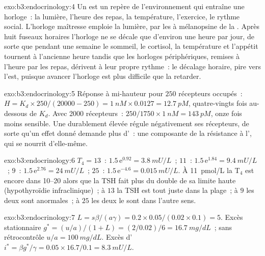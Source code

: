 \begin{solution}{exo:b3:endocrinology:4}
Un  est un repère de l'environnement qui entraîne une horloge~:
la lumière, l'heure des repas, la température, l'exercice, le rythme
social. L'horloge maîtresse emploie la lumière, par les  à mélanopsine de la . Après huit fuseaux horaires
l'horloge ne se décale que d'environ une heure par jour, de sorte que
pendant une semaine le sommeil, le cortisol, la température et l'appétit
tournent à l'ancienne heure tandis que les horloges périphériques,
remises à l'heure par les repas, dérivent à leur propre rythme~: le
décalage horaire, pire vers l'est, puisque avancer l'horloge est plus
difficile que la retarder.
\end{solution}

\begin{solution}{exo:b3:endocrinology:5}
Réponse à mi-hauteur pour $250$ récepteurs occupés~: $H = K_{d}\times
250/(\num{20000} - 250) = \qty{1}{nM}\times 0.0127 = \qty{12.7}{pM}$,
quatre-vingts fois au-dessous de $K_{d}$. Avec \num{2000} récepteurs~: $250/1750
\times \qty{1}{nM} = \qty{143}{pM}$, onze fois moins sensible. Une
 durablement élevée régule négativement ses récepteurs, de sorte
qu'un effet donné demande plus d'~: une composante de la
résistance à l', qui se nourrit d'elle-même.
\end{solution}

\begin{solution}{exo:b3:endocrinology:6}
$T_{4} = 13$~: $1.5\,\mathrm{e}^{0.92} = \qty{3.8}{mU/L}$~; $11$~:
$1.5\,\mathrm{e}^{1.84} = \qty{9.4}{mU/L}$~; $9$~: $1.5\,\mathrm{e}^{2.76}
= \qty{24}{mU/L}$~; $25$~: $1.5\,\mathrm{e}^{-4.6} = \qty{0.015}{mU/L}$. À
\qty{11}{pmol/L} la T$_{4}$ est encore dans \qtyrange{10}{20}{} alors
que la TSH fait plus du double de sa limite haute (hypothyroïdie
infraclinique)~; à $13$ la TSH est tout juste dans la plage~; à $9$ les
deux sont anormales~; à $25$ les deux le sont dans l'autre sens.
\end{solution}

\begin{solution}{exo:b3:endocrinology:7}
$L = s\beta/(a\gamma) = 0.2\times 0.05/(0.02\times 0.1) = 5$. Excès
stationnaire $g^{*} = (u/a)/(1 + L) = (2/0.02)/6 = \qty{16.7}{mg/dL}$~;
sans rétrocontrôle $u/a = \qty{100}{mg/dL}$. Excès d' $i^{*} = \beta g^{*}/
\gamma = 0.05\times 16.7/0.1 = \qty{8.3}{mU/L}$.
\end{solution}

